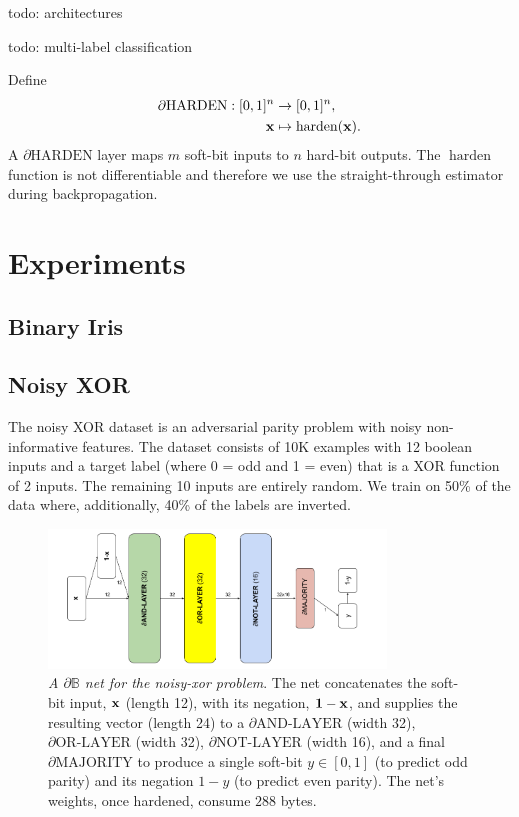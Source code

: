 \documentclass{article} %
\begin{document}
todo: architectures

todo: multi-label classification

Define
\begin{equation*}
\begin{aligned}
\partial\text{HARDEN}: [0,1]^{n} &\to [0,1]^{n}, \\
{\bf x} &\mapsto \operatorname{harden}({\bf x})\text{.}
\end{aligned}
\end{equation*}
A $\partial\text{HARDEN}$ layer maps $m$ soft-bit inputs to $n$ hard-bit outputs. The $\operatorname{harden}$ function is not differentiable and therefore we use the straight-through estimator \citep{DBLP:journals/corr/BengioLC13} during backpropagation.


\section{Experiments}

\subsection{Binary Iris}

\subsection{Noisy XOR}

The noisy XOR dataset \citep{noisy-xor-dataset} is an adversarial parity problem with noisy non-informative features. The dataset consists of 10K examples with 12 boolean inputs and a target label (where 0 = odd and 1 = even) that is a XOR function of 2 inputs. The remaining 10 inputs are entirely random. We train on 50\% of the data where, additionally, 40\% of the labels are inverted.

\begin{figure}[t]
	\centering
	\includegraphics[width=0.8\textwidth]{noisy-xor-architecture.png}
	\caption{{\em A $\partial\mathbb{B}$ net for the noisy-xor problem}. The net concatenates the soft-bit input, ${\bf x}$ (length 12), with its negation, ${\bf 1 - x}$, and supplies the resulting vector (length 24) to a $\partial\text{AND-LAYER}$ (width 32), $\partial\text{OR-LAYER}$ (width 32),  $\partial\text{NOT-LAYER}$ (width 16), and a final $\partial\text{MAJORITY}$ to produce a single soft-bit $y \in [0,1]$ (to predict odd parity) and its negation $1-y$ (to predict even parity). The net's weights, once hardened, consume $288$ bytes.}
	\label{fig:noisy-xor-architecture}
\end{figure}
\end{document}
